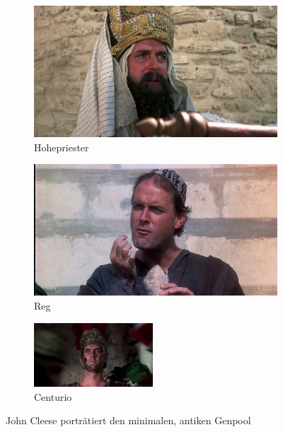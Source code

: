 \documentclass{scrartcl}
\begin{document}
	\blindtext
	

	\begin{figure}[t]
	\begin{subfigure}{.3\textwidth}
		\includegraphics[width=\textwidth]{brian1}
		\caption{Hohepriester}
	\end{subfigure}
	\begin{subfigure}{.3\textwidth}
		\includegraphics[width=\textwidth]{brian2}
		\caption{Reg}
	\end{subfigure}
	\begin{subfigure}{.333\textwidth}
		\includegraphics[width=\textwidth, height=24mm]{brian3}
		\caption{Centurio}
	\end{subfigure}
	\caption{John Cleese porträtiert den minimalen, antiken Genpool}		
    \end{figure}
\end{document}
